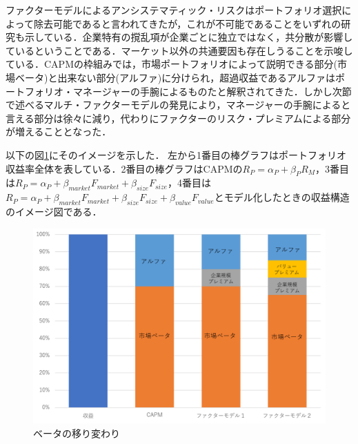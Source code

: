 ﻿\documentclass[11pt]{jreport}
\begin{document}
ファクターモデルによるアンシステマティック・リスクはポートフォリオ選択によって除去可能であると言われてきたが，これが不可能であることをいずれの研究も示している．企業特有の撹乱項が企業ごとに独立ではなく，共分散が影響しているということである．マーケット以外の共通要因も存在しうることを示唆している．CAPMの枠組みでは，市場ポートフォリオによって説明できる部分(市場ベータ)と出来ない部分(アルファ)に分けられ，超過収益であるアルファはポートフォリオ・マネージャーの手腕によるものたと解釈されてきた．しかし次節で述べるマルチ・ファクターモデルの発見により，マネージャーの手腕によると言える部分は徐々に減り，代わりにファクターのリスク・プレミアムによる部分が増えることとなった．

以下の図\ref{fig:beta}にそのイメージを示した．
左から1番目の棒グラフはポートフォリオ収益率全体を表している．2番目の棒グラフはCAPMの$R_P=\alpha_P + \beta_PR_M$，3番目は$R_P = \alpha_P + \beta_{market}F_{market} + \beta_{size}F_{size}$，4番目は$R_P = \alpha_P + \beta_{market}F_{market} + \beta_{size}F_{size} + \beta_{value}F_{value}$とモデル化したときの収益構造のイメージ図である．

\begin{figure}[H]
	\begin{center}
		\includegraphics[width=14cm]{./fig/beta}
		\caption{ベータの移り変わり}
		\label{fig:beta}
	\end{center}
\end{figure}
\end{document}
